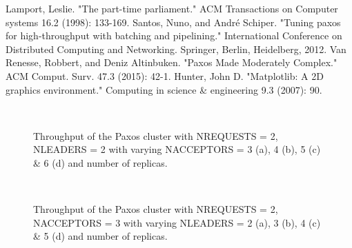 \documentclass[conference]{IEEEtran}
\begin{document}
\begin{thebibliography}{00}
 Lamport, Leslie. "The part-time parliament." ACM Transactions on Computer systems 16.2 (1998): 133-169.
 Santos, Nuno, and André Schiper. "Tuning paxos for high-throughput with batching and pipelining." International Conference on Distributed Computing and Networking. Springer, Berlin, Heidelberg, 2012.
 Van Renesse, Robbert, and Deniz Altinbuken. "Paxos Made Moderately Complex." ACM Comput. Surv. 47.3 (2015): 42-1.
 Hunter, John D. "Matplotlib: A 2D graphics environment." Computing in science \& engineering 9.3 (2007): 90.
\end{thebibliography}
\begin{multicols}{1}
\end{multicols}
\begin{figure*}[h]
	\begin{minipage}{\textwidth}
		\label{figure1}
		\centering
		\quad
		\\
		\quad
		\caption{Throughput of the Paxos cluster with NREQUESTS = 2, NLEADERS = 2 with varying NACCEPTORS = 3 (a), 4 (b), 5 (c) \& 6 (d) and number of replicas. }
	\end{minipage}%
\end{figure*}
\begin{figure*}[h]
	\begin{minipage}{\textwidth}
		\label{figure2}
		\centering
		\quad
		\\
		\quad
		\caption{Throughput of the Paxos cluster with NREQUESTS = 2, NACCEPTORS = 3 with varying NLEADERS = 2 (a), 3 (b), 4 (c) \& 5 (d) and number of replicas. }
	\end{minipage}%
\end{figure*}
\begin{multicols}{1}
\end{multicols}
\end{document}

